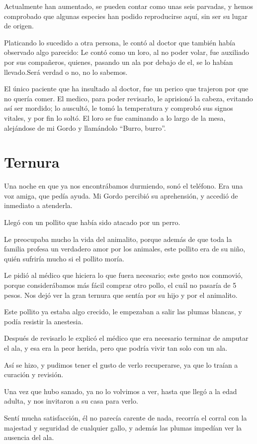 \documentclass[letterpaper, 12pt]{book}
\begin{document}
Actualmente han aumentado, se pueden contar como unas seis parvadas, y hemos comprobado que algunas especies han podido reproducirse aquí, sin ser su lugar de origen.

Platicando lo sucedido a otra persona, le contó al doctor que también había observado algo parecido: Le contó como un loro, al no poder volar, fue auxiliado por sus compañeros, quienes, pasando un ala por debajo de el, se lo habían llevado.Será verdad o no, no lo sabemos.

El único paciente que ha insultado al doctor, fue un perico que trajeron por que no quería comer. El medico, para poder revisarlo, le aprisionó la cabeza, evitando así ser mordido; lo auscultó, le tomó la temperatura y comprobó sus signos vitales, y por fin lo soltó. El loro se fue caminando a lo largo de la mesa, alejándose de mi Gordo y llamándolo ``Burro, burro''.


\chapter{Ternura}
Una noche en que ya nos encontrábamos durmiendo, sonó el teléfono. Era una voz amiga, que pedía ayuda. Mi Gordo percibió su aprehensión, y accedió de inmediato a atenderla. 

Llegó con un pollito que había sido atacado por un perro.

Le preocupaba mucho la vida del animalito, porque además de que toda la familia profesa un verdadero amor por los animales, este pollito era de su niño, quién sufriría mucho si el pollito moría. 

Le pidió al médico que hiciera lo que fuera necesario; este gesto nos conmovió, porque considerábamos más fácil comprar otro pollo, el cuál no pasaría de 5 pesos. Nos dejó ver la gran ternura que sentía por su hijo y por el animalito.

Este pollito ya estaba algo crecido, le empezaban a salir las plumas blancas, y podía resistir la anestesia. 

Después de revisarlo le explicó el médico que era necesario terminar de amputar el ala, y esa era la peor herida, pero que podría vivir tan solo con un ala.

Así se hizo, y pudimos tener el gusto de verlo recuperarse, ya que lo traían a curación y revisión. 

Una vez que hubo sanado, ya no lo volvimos a ver, hasta que llegó a la edad adulta, y nos invitaron a su casa para verlo.

Sentí mucha satisfacción, él no parecía carente de nada, recorría el corral con la majestad y seguridad de cualquier gallo, y además las plumas impedían ver la ausencia del ala.
\end{document}
